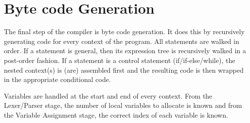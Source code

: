 \documentclass{standalone}
\begin{document}
	\section{Byte code Generation}
		The final step of the compiler is byte code generation. It does this by recursively generating code for every context of the program. All statements are walked in order. If a statement is general, then its expression tree is recursively walked in a post-order fashion. If a statement is a control statement (if/if-else/while), the nested context(s) is (are) assembled first and the resulting code is then wrapped in the appropriate conditional code.

		Variables are handled at the start and end of every context. From the Lexer/Parser stage, the number of local variables to allocate is known and from the Variable Assignment stage, the correct index of each variable is known.
\end{document}
